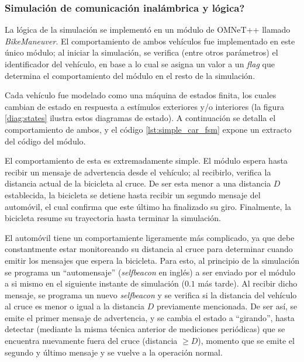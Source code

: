 \documentclass[11pt,letterpaper]{article}
\begin{document}
\subsubsection{Simulación de comunicación inalámbrica y lógica?}\label{section:prot_communication}

La lógica de la simulación se implementó en un módulo de OMNeT++ llamado \emph{BikeManeuver}. El comportamiento de ambos vehículos fue implementado en este único módulo; al iniciar la simulación, se verifica (entre otros parámetros) el identificador del vehículo, en base a lo cual se asigna un valor a un \emph{flag} que determina el comportamiento del módulo en el resto de la simulación.

Cada vehículo fue modelado como una máquina de estados finita, los cuales cambian de estado en respuesta a estímulos exteriores y/o interiores (la figura \ref{diag:states} ilustra estos diagramas de estado). A continuación se detalla el comportamiento de ambos, y el código \ref{lst:simple_car_fsm} expone un extracto del código del módulo.

\begin{description}[leftmargin=!,labelwidth=\widthof{\bfseries Automóvil}]
    \item [Bicicleta]  El comportamiento de esta es extremadamente simple. El módulo espera hasta recibir un mensaje de advertencia desde el vehículo; al recibirlo, verifica la distancia actual de la bicicleta al cruce. De ser esta menor a una distancia $D$ establecida, la bicicleta se detiene hasta recibir un segundo mensaje del automóvil, el cual confirma que este último ha finalizado su giro. Finalmente, la bicicleta resume su trayectoria hasta terminar la simulación.
    \item [Automóvil]  El automóvil tiene un comportamiente ligeramente más complicado, ya que debe constantmente estar monitoreando su distancia al cruce para determinar cuando emitir los mensajes que espera la bicicleta. Para esto, al principio de la simulación se programa un ``automensaje'' (\emph{selfbeacon} en inglés) a ser enviado por el módulo a si mismo en el siguiente instante de simulación ($0.1$ más tarde). Al recibir dicho mensaje, se programa un nuevo \emph{selfbeacon} y se verifica si la distancia del vehículo al cruce es menor o igual a la distancia $D$ previamente mencionada. De ser así, se emite el primer mensaje de advertencia, y se cambia el estado a ``girando'', hasta detectar (mediante la misma técnica anterior de mediciones periódicas) que se encuentra nuevamente fuera del cruce (distancia $\geq D$), momento que se emite el segundo y último mensaje y se vuelve a la operación normal.
\end{description}
\end{document}
